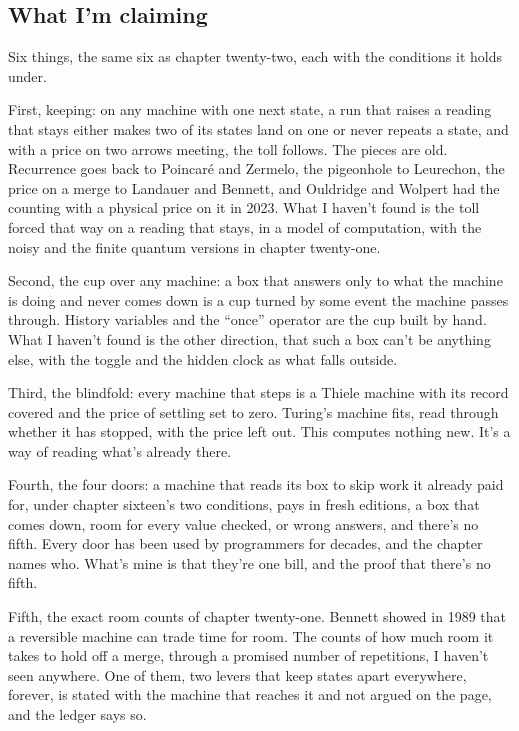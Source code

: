 \documentclass[11pt,twoside]{article}
\theoremstyle{thielethm}
\theoremstyle{thieledef}
\theoremstyle{thieledef}
\theoremstyle{thieledef}
\theoremstyle{thielethm}
\theoremstyle{thieleobs}
\theoremstyle{thielethm}
\begin{document}
\subsection{What I'm claiming}

Six things, the same six as chapter twenty-two, each with the conditions it holds under.

First, keeping: on any machine with one next state, a run that raises a reading that stays either makes two of its states land on one or never repeats a state, and with a price on two arrows meeting, the toll follows. The pieces are old. Recurrence goes back to Poincaré and Zermelo, the pigeonhole to Leurechon, the price on a merge to Landauer and Bennett, and Ouldridge and Wolpert had the counting with a physical price on it in 2023. What I haven't found is the toll forced that way on a reading that stays, in a model of computation, with the noisy and the finite quantum versions in chapter twenty-one.

Second, the cup over any machine: a box that answers only to what the machine is doing and never comes down is a cup turned by some event the machine passes through. History variables and the ``once'' operator are the cup built by hand. What I haven't found is the other direction, that such a box can't be anything else, with the toggle and the hidden clock as what falls outside.

Third, the blindfold: every machine that steps is a Thiele machine with its record covered and the price of settling set to zero. Turing's machine fits, read through whether it has stopped, with the price left out. This computes nothing new. It's a way of reading what's already there.

Fourth, the four doors: a machine that reads its box to skip work it already paid for, under chapter sixteen's two conditions, pays in fresh editions, a box that comes down, room for every value checked, or wrong answers, and there's no fifth. Every door has been used by programmers for decades, and the chapter names who. What's mine is that they're one bill, and the proof that there's no fifth.

Fifth, the exact room counts of chapter twenty-one. Bennett showed in 1989 that a reversible machine can trade time for room. The counts of how much room it takes to hold off a merge, through a promised number of repetitions, I haven't seen anywhere. One of them, two levers that keep states apart everywhere, forever, is stated with the machine that reaches it and not argued on the page, and the ledger says so.
\end{document}
